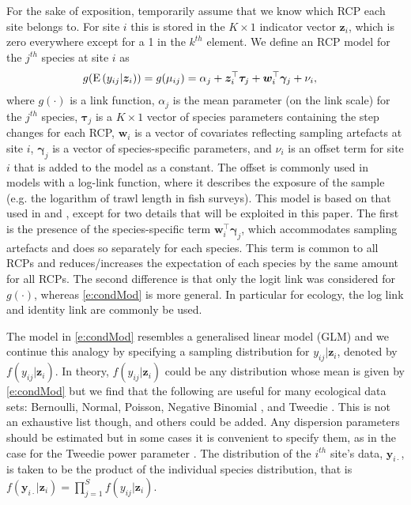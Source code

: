 \documentclass{statsoc}
\newcommand{\vz}{\bm{z}}
\newcommand{\vg}{\bm{\gamma}}
\newcommand{\vt}{\bm{\tau}}
\newcommand{\vy}{\bm{y}}
\newcommand{\vw}{\bm{w}}
\newcommand{\ev}[1]{{\rm E}\left(#1\right)}
\begin{document}
For the sake of exposition, temporarily assume that we know which RCP each site belongs to. For site $i$ this is stored in the $K\times1$ indicator vector $\vz_i$, which is zero everywhere except for a 1 in the $k^{th}$ element. We define an RCP model for the $j^{th}$ species at site $i$ as
\begin{align}
	g(\ev{y_{ij}|\vz_i}) &= g(\mu_{ij})=\alpha_j+\vz_i^\top\vt_j +\vw_i^\top\vg_j+\nu_i,\label{e:condMod}
\end{align}
where $g(\cdot)$ is a link function, $\alpha_j$ is the mean parameter (on the link scale) for the $j^{th}$ species, $\vt_j$ is a $K\times1$ vector of species parameters containing the step changes for each RCP, $\vw_i$ is a vector of covariates reflecting sampling artefacts at site $i$, $\vg_j$ is a vector of species-specific parameters, and $\nu_i$ is an offset term for site $i$ that is added to the model as a constant. The offset is commonly used in models with a log-link function, where it describes the exposure of the sample (e.g. the logarithm of trawl length in fish surveys). This model is based on that used in \citet{fos13} and \citet{lyo15}, except for two details that will be exploited in this paper. The first is the presence of the species-specific term $\vw_i^\top\vg_j$, which accommodates sampling artefacts and does so separately for each species. This term is common to all RCPs and reduces/increases the expectation of each species by the same amount for all RCPs. The second difference is that only the logit link was considered for $g(\cdot)$, whereas \eqref{e:condMod} is more general. In particular for ecology, the log link and identity link are commonly be used. 

The model in \eqref{e:condMod} resembles a generalised linear model (GLM) and we continue this analogy by specifying a sampling distribution for $y_{ij}|\vz_i$, denoted by $f(y_{ij}|\vz_i)$. In theory, $f(y_{ij}|\vz_i)$ could be any distribution whose mean is given by \eqref{e:condMod} but we find that the following are useful for many ecological data sets: Bernoulli, Normal, Poisson, Negative Binomial \citep[see][]{law87,ven02}, and Tweedie \citep[see][]{smy96,fos13a}. This is not an exhaustive list though, and others could be added. Any dispersion parameters should be estimated but in some cases it is convenient to specify them, as in the case for the Tweedie power parameter \citep[but see][]{fos13a}. The distribution of the $i^{th}$ site's data, $\vy_{i\cdot}$, is taken to be the product of the individual species distribution, that is $f(\vy_{i\cdot}|\vz_i)=\prod_{j=1}^Sf(y_{ij}|\vz_i)$.
\end{document}
